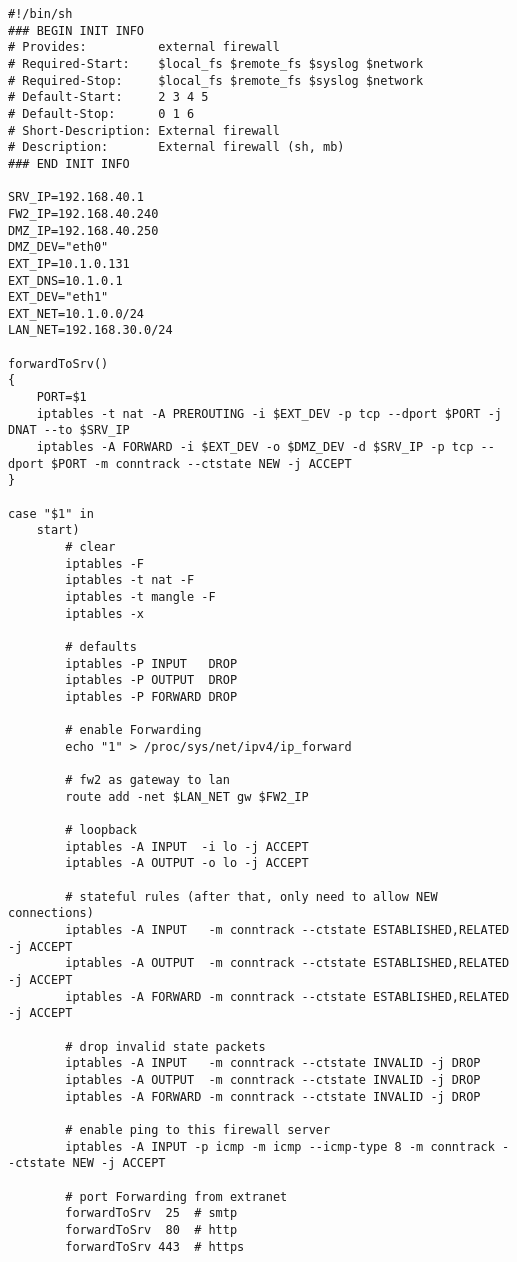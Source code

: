 \begin{lstlisting}[label=lst:masq,caption={Masquerading.}]
#!/bin/sh
### BEGIN INIT INFO
# Provides:          external firewall
# Required-Start:    $local_fs $remote_fs $syslog $network
# Required-Stop:     $local_fs $remote_fs $syslog $network
# Default-Start:     2 3 4 5
# Default-Stop:      0 1 6
# Short-Description: External firewall
# Description:       External firewall (sh, mb)
### END INIT INFO

SRV_IP=192.168.40.1
FW2_IP=192.168.40.240
DMZ_IP=192.168.40.250
DMZ_DEV="eth0"
EXT_IP=10.1.0.131
EXT_DNS=10.1.0.1
EXT_DEV="eth1"
EXT_NET=10.1.0.0/24
LAN_NET=192.168.30.0/24

forwardToSrv()
{
    PORT=$1
    iptables -t nat -A PREROUTING -i $EXT_DEV -p tcp --dport $PORT -j DNAT --to $SRV_IP
    iptables -A FORWARD -i $EXT_DEV -o $DMZ_DEV -d $SRV_IP -p tcp --dport $PORT -m conntrack --ctstate NEW -j ACCEPT
}

case "$1" in
    start)
        # clear
        iptables -F
        iptables -t nat -F
        iptables -t mangle -F
        iptables -x

        # defaults
        iptables -P INPUT   DROP
        iptables -P OUTPUT  DROP
        iptables -P FORWARD DROP

        # enable Forwarding
        echo "1" > /proc/sys/net/ipv4/ip_forward

        # fw2 as gateway to lan
        route add -net $LAN_NET gw $FW2_IP

        # loopback
        iptables -A INPUT  -i lo -j ACCEPT
        iptables -A OUTPUT -o lo -j ACCEPT

        # stateful rules (after that, only need to allow NEW connections)
        iptables -A INPUT   -m conntrack --ctstate ESTABLISHED,RELATED -j ACCEPT
        iptables -A OUTPUT  -m conntrack --ctstate ESTABLISHED,RELATED -j ACCEPT
        iptables -A FORWARD -m conntrack --ctstate ESTABLISHED,RELATED -j ACCEPT

        # drop invalid state packets
        iptables -A INPUT   -m conntrack --ctstate INVALID -j DROP
        iptables -A OUTPUT  -m conntrack --ctstate INVALID -j DROP
        iptables -A FORWARD -m conntrack --ctstate INVALID -j DROP

        # enable ping to this firewall server
        iptables -A INPUT -p icmp -m icmp --icmp-type 8 -m conntrack --ctstate NEW -j ACCEPT

        # port Forwarding from extranet
        forwardToSrv  25  # smtp
        forwardToSrv  80  # http
        forwardToSrv 443  # https


\end{lstlisting}
